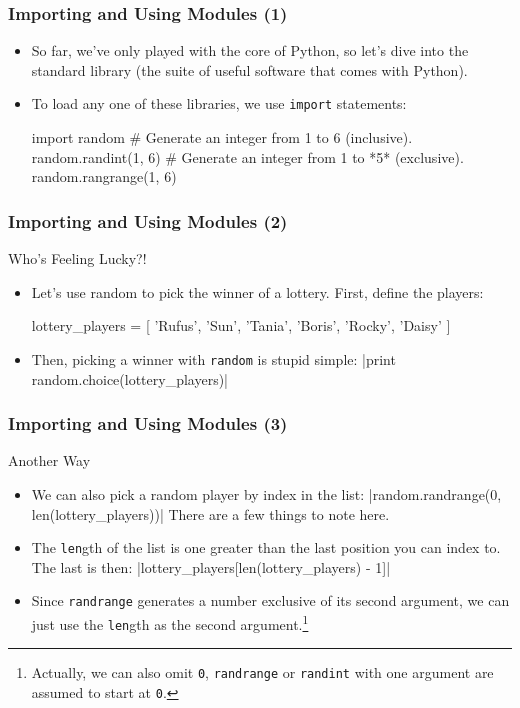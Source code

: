 \documentclass[10pt]{beamer}
\begin{document}
\begin{frame}[fragile]
  \frametitle{Importing and Using Modules (1)}
  \begin{itemize}
    \item So far, we've only played with the core of Python, so let's dive into the standard library (the suite of useful software that comes with Python).
    \item To load any one of these libraries, we use \texttt{import} statements:
      \begin{pythoncode}
  import random
  # Generate an integer from 1 to 6 (inclusive).
  random.randint(1, 6)
  # Generate an integer from 1 to *5* (exclusive).
  random.rangrange(1, 6)
      \end{pythoncode}
  \end{itemize}
\end{frame}

\begin{frame}[fragile]
  \frametitle{Importing and Using Modules (2)}
  \begin{block}{Who's Feeling Lucky?!}
    \begin{itemize}
      \item Let's use random to pick the winner of a lottery.
        First, define the players:
        \begin{pythoncode}
  lottery_players = [
    'Rufus', 'Sun', 'Tania',
    'Boris', 'Rocky', 'Daisy'
  ]
        \end{pythoncode}
      \item Then, picking a winner with \texttt{random} is stupid simple:
        |print random.choice(lottery_players)|
    \end{itemize}
  \end{block}
\end{frame}

\begin{frame}[fragile]
  \frametitle{Importing and Using Modules (3)}
  \begin{block}{Another Way}
    \begin{itemize}
      \item We can also pick a random player by index in the list:
      |random.randrange(0, len(lottery_players))|
      There are a few things to note here.
      \item The \texttt{len}gth of the list is one greater than the last position you can index to.
      The last is then:
        |lottery_players[len(lottery_players) - 1]|
      \item Since \texttt{randrange} generates a number exclusive of its second argument, we can just use the \texttt{len}gth as the second argument.\footnote{Actually, we can also omit \texttt{0}, \texttt{randrange} or \texttt{randint} with one argument are assumed to start at \texttt{0}.}
    \end{itemize}
  \end{block}
\end{frame}
\end{document}
